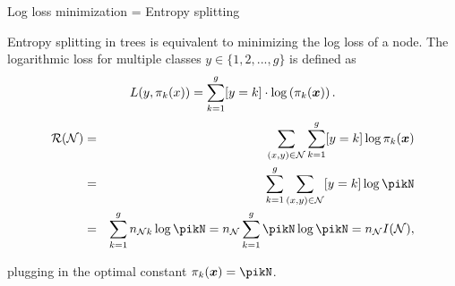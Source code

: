 \begin{vbframe}{Log loss minimization = Entropy splitting}

Entropy splitting in trees is equivalent to minimizing the log loss of a node. The logarithmic loss for multiple classes $y \in \{1, 2, ..., g\}$ is defined as
$$ L(y, \pi_k(x)) = \sum_{k = 1}^g [y = k] \cdot \log \left(\pi_k(\bm{x})\right). $$
\vspace{-0.4cm}
\begin{eqnarray*}
\risk(\Np) &=& \sum_{\xy \in \Np}  \sum_{k = 1}^g [y = k] \log \pi_k(\xv) \\
&=& \sum_{k = 1}^g \sum_{\xy \in \Np} [y = k] \log \pikN \\
&=& \sum_{k = 1}^g n_{\Np k} \log \pikN = n_{\Np} \sum_{k = 1}^g \pikN \log \pikN = n_\Np I(\Np), 
\end{eqnarray*} 

plugging in the optimal constant $\pi_k(\xv) = \pikN$.




\end{vbframe}














